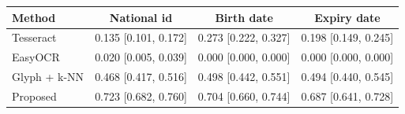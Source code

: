 \begin{tabular}{lccc}
\toprule
Method & National id & Birth date & Expiry date\\
\midrule
Tesseract & 0.135 [0.101, 0.172] & 0.273 [0.222, 0.327] & 0.198 [0.149, 0.245] \\
EasyOCR & 0.020 [0.005, 0.039] & 0.000 [0.000, 0.000] & 0.000 [0.000, 0.000] \\
Glyph + k-NN & 0.468 [0.417, 0.516] & 0.498 [0.442, 0.551] & 0.494 [0.440, 0.545] \\
Proposed & 0.723 [0.682, 0.760] & 0.704 [0.660, 0.744] & 0.687 [0.641, 0.728] \\
\bottomrule
\end{tabular}
